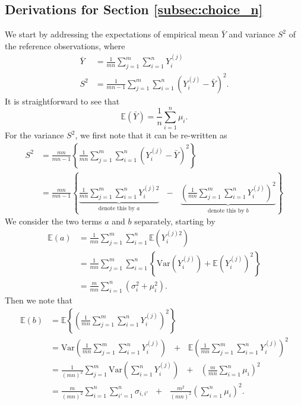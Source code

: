 \documentclass{article}
\newcommand{\sd}{s}
\begin{document}
\subsection{Derivations for Section \ref{subsec:choice_n}}
\label{appendix:derivation_n}

We start by addressing the expectations of empirical mean $\bar{Y}$ and variance $S^2$ of the reference observations, where
\begin{align*}
\bar{Y} & = \frac{1}{mn} \sum_{j = 1}^m \sum_{i = 1}^n Y_i^{(j)}\\
S^2 & = \frac{1}{mn - 1} \sum_{j = 1}^m \sum_{i = 1}^n \left(Y_i^{(j)} - \bar{Y}\right)^2.
\end{align*}
It is straightforward to see that 
\begin{equation}
\mathbb{E}(\bar{Y}) = \frac{1}{n} \sum_{i = 1}^n \mu_i.
\end{equation}
For the variance $S^2$, we first note that it can be re-written as
\begin{align}
S^2 & = \frac{mn}{mn - 1} \left\{\frac{1}{mn} \sum_{j = 1}^m \sum_{i = 1}^n \left(Y_i^{(j)} - \bar{Y}\right)^2 \right\}\\
& = \frac{mn}{mn - 1} \left\{ \underbrace{\frac{1}{mn} \sum_{j = 1}^m \sum_{i = 1}^n Y_i^{(j)2}}_{\text{denote this by } a} \ \ \ - \ \ \ \underbrace{\left(\frac{1}{mn} \sum_{j = 1}^m \sum_{i = 1}^n Y_i^{(j)} \right)^2}_{\text{denote this by } b} \right\} \label{eq:sigma2hat}
\end{align}
We consider the two terms $a$ and $b$ separately, starting by
\begin{align*}
\mathbb{E}(a) & = \frac{1}{mn} \sum_{j = 1}^m \sum_{i = 1}^n \mathbb{E}\left(Y_i^{(j)2}\right)\\
& = \frac{1}{mn} \sum_{j = 1}^m \sum_{i = 1}^n \left\{ \text{Var}\left(Y_i^{(j)}\right) + \mathbb{E}\left(Y_i^{(j)}\right)^2 \right\}\\
& = \frac{m}{mn} \sum_{i = 1}^n (\sigma_{i}^2 + \mu_i^2).
\end{align*}
Then we note that
\begin{align*}
\mathbb{E}(b) & = \mathbb{E}\left\{\left(\frac{1}{mn} \sum_{j = 1}^m \sum_{i = 1}^n Y_i^{(j)} \right)^2\right\}\\
& = \text{Var}\left( \frac{1}{mn} \sum_{j = 1}^m \sum_{i = 1}^n Y_i^{(j)} \right) \ \ \ + \ \ \ \mathbb{E}\left(\frac{1}{mn}  \sum_{j = 1}^m \sum_{i = 1}^n Y_i^{(j)} \right)^2\\
& = \frac{1}{(mn)^2}\sum_{j = 1}^m \text{Var}\left(\sum_{i = 1}^n Y_i^{(j)} \right) \ \ \ + \ \ \ \left(\frac{m}{mn} \sum_{i = 1}^n \mu_i\right)^2\\
& = \frac{m}{(mn)^2} \sum_{i = 1}^n \sum_{i' = 1}^n \sigma_{i,i'} \ \ \ + \ \ \ \frac{m^2}{(mn)^2}\left(\sum_{i = 1}^n \mu_i\right)^2.
\end{align*}
\end{document}
